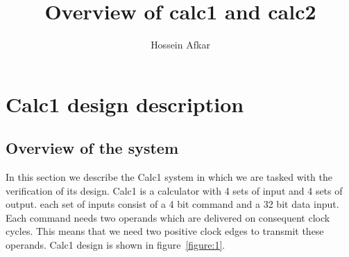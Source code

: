 \documentclass[a4paper, 11pt]{article}
\title{Overview of calc1 and calc2}
\author{Hossein Afkar}
\begin{document}
\maketitle

\section{Calc1 design description}
\subsection{Overview of the system}
In this section we describe the Calc1 system in which we are tasked with the
verification of its design. Calc1 is a calculator with 4 sets of input and 4
sets of output. each set of inputs consist of a 4 bit command and a 32 bit data
input. Each command needs two operands which are delivered on consequent clock
cycles. This means that we need two positive clock edges to transmit these
operands. Calc1 design is shown in figure~\ref{figure:1}.
\end{document}
